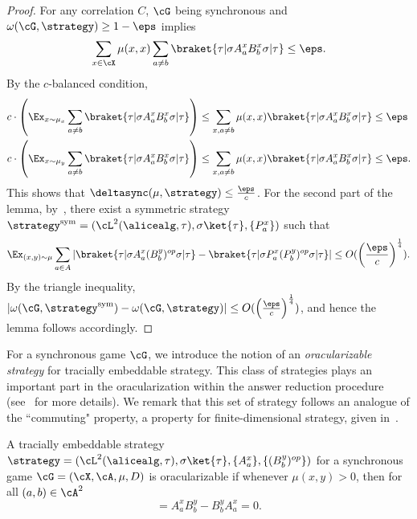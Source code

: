 \begin{proof}
	For any correlation $C$, $\cG$ being synchronous and $\omega(\cG, \strategy) \geq 1 - \eps$ implies
	\begin{equation*}
		\sum_{x \in \cX} \mu(x,x)  \sum_{a \neq b} \braket{\tau|\sigma A_a^x B_b^x \sigma| \tau} \leq  \eps.
	\end{equation*}
	By the $c$-balanced condition,
	\begin{align*}
		c\cdot \left(\Ex_{x \sim \mu_x} \sum_{a \neq b}\braket{\tau|\sigma A_a^x B_b^x \sigma| \tau}\right)	&\leq \sum_{x, a\neq b} \mu(x,x) \braket{\tau|\sigma A_a^x B_b^x \sigma| \tau} \leq \eps \\
		c\cdot \left(\Ex_{x \sim \mu_y} \sum_{a \neq b}\braket{\tau|\sigma A_a^x B_b^x \sigma| \tau}\right)	&\leq \sum_{x, a\neq b} \mu(x,x) \braket{\tau|\sigma A_a^x B_b^x \sigma| \tau} \leq \eps.
	\end{align*}
	This shows that $ \deltasync(\mu, \strategy)\leq \frac{\eps}{c}$. For the second part of the lemma, by~, there exist a symmetric strategy $\strategy^{\text{sym}} = ( \cL^2(\alicealg, \tau), \sigma \ket{\tau},\{ P_{a}^x \})$ such that 
	\begin{equation}
		\Ex_{(x,y) \sim \mu} \sum_{a \in A} |\braket{\tau| \sigma A_a^x (B_b^y)^{op} \sigma |\tau} -\braket{\tau| \sigma P_a^x (P_b^y)^{op} \sigma |\tau}| \leq O(\left(\frac{\eps}{c} \right)^{\frac{1}{4}}).
	\end{equation} 	
	By the triangle inequality, $|\omega(\cG, \strategy^{\text{sym}}) -  \omega(\cG, \strategy)| \leq O( \left(\frac{\eps}{c} \right)^{\frac{1}{4}})$, and hence the lemma follows accordingly. 
\end{proof}

For a synchronous game $\cG$, we introduce the notion of an \textit{oracularizable strategy} for tracially embeddable strategy. This class of strategies plays an important part in the oracularization within the answer reduction procedure (see~ for more details). We remark that this set of strategy follows an analogue of the ``commuting" property, a property for finite-dimensional strategy, given in~\cite[Definition 5.8]{jiMIPRE2022a}.

\begin{definition} \label{def:Oracularizablestrategies}
	A tracially embeddable strategy $\strategy = ( \cL^2(\alicealg, \tau), \sigma \ket{\tau}, \\ \{ A_{a}^x \},  \{ (B_{b}^y)^{op} \} )$ for a synchronous game $\cG = (\cX, \cA, \mu, D)$ is oracularizable if whenever $\mu(x,y) >0$, then for all $(a,b) \in \cA^2$
	\begin{equation*}
		[A_{a}^x, B_{b}^y] = A_{a}^x B_{b}^y - B_{b}^y A_{a}^x = 0. 
	\end{equation*}
\end{definition}

